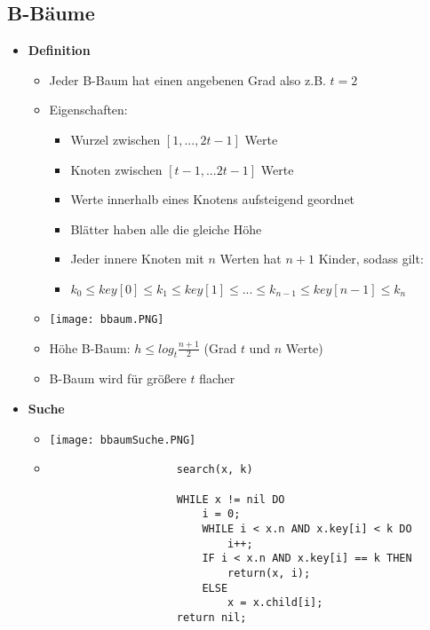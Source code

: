 \subsection{B-Bäume}
    \begin{itemize}
        \item \textbf{Definition}
            \begin{itemize}
                \item Jeder B-Baum hat einen angebenen Grad also z.B. $t=2$
                \item Eigenschaften:
                    \begin{itemize}
                        \item Wurzel zwischen $[1,...,2t-1]$ Werte
                        \item Knoten zwischen $[t-1,...2t-1]$ Werte
                        \item Werte innerhalb eines Knotens aufsteigend geordnet
                        \item Blätter haben alle die gleiche Höhe
                        \item Jeder innere Knoten mit $n$ Werten hat $n+1$ Kinder, sodass gilt:
                        \item[] $k_0 \leq key[0] \leq k_1 \leq key[1] \leq ... \leq k_{n-1} \leq key[n-1] \leq k_n$
                    \end{itemize}
                \item[] \texttt{[image: bbaum.PNG]}
                \item Höhe B-Baum: $h \leq log_t \frac{n+1}{2}$ (Grad $t$ und $n$ Werte)
                \item B-Baum wird für größere $t$ flacher
            \end{itemize}
        
        \item \textbf{Suche}
            \begin{itemize}
                \item[] \texttt{[image: bbaumSuche.PNG]}
                \item[]
                    \begin{verbatim}
                    search(x, k)

                    WHILE x != nil DO
                        i = 0;
                        WHILE i < x.n AND x.key[i] < k DO
                            i++;
                        IF i < x.n AND x.key[i] == k THEN
                            return(x, i);
                        ELSE
                            x = x.child[i];
                    return nil;
                    \end{verbatim}
            \end{itemize}


\end{itemize}
